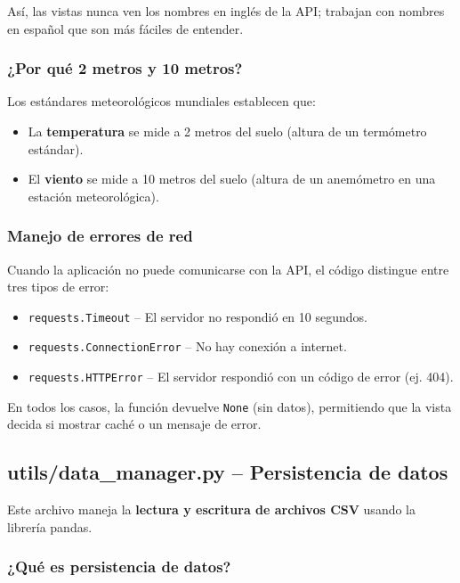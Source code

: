 \documentclass[12pt,a4paper]{article}
\begin{document}
Así, las vistas nunca ven los nombres en inglés de la API; trabajan con nombres en español que son más fáciles de entender.

\subsubsection*{¿Por qué 2 metros y 10 metros?}

Los estándares meteorológicos mundiales establecen que:
\begin{itemize}
    \item La \textbf{temperatura} se mide a 2 metros del suelo (altura de un termómetro estándar).
    \item El \textbf{viento} se mide a 10 metros del suelo (altura de un anemómetro en una estación meteorológica).
\end{itemize}

\subsubsection*{Manejo de errores de red}

Cuando la aplicación no puede comunicarse con la API, el código distingue entre tres tipos de error:

\begin{itemize}
    \item \texttt{requests.Timeout} -- El servidor no respondió en 10 segundos.
    \item \texttt{requests.ConnectionError} -- No hay conexión a internet.
    \item \texttt{requests.HTTPError} -- El servidor respondió con un código de error (ej. 404).
\end{itemize}

En todos los casos, la función devuelve \texttt{None} (sin datos), permitiendo que la vista decida si mostrar caché o un mensaje de error.

\newpage
\subsection{utils/data\_manager.py -- Persistencia de datos}

Este archivo maneja la \textbf{lectura y escritura de archivos CSV} usando la librería pandas.

\subsubsection*{¿Qué es persistencia de datos?}
\end{document}
